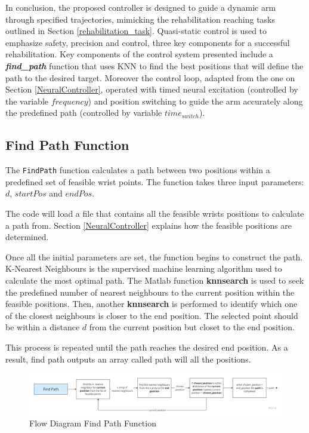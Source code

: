 In conclusion, the proposed controller is designed to guide a dynamic arm through specified trajectories, mimicking the rehabilitation reaching tasks outlined in Section \ref{rehabilitation_task}. Quasi-static control is used to emphasize safety, precision and control, three key components for a successful rehabilitation. Key components of the control system presented include a \textbf{\textit{find\_path} }function that uses KNN to find the best positions that will define the path to the desired target. Moreover the control loop, adapted from the one on Section \ref{NeuralController}, operated with timed neural excitation (controlled by the variable $frequency$) and position switching to guide the arm accurately along the predefined path (controlled by variable $time_{switch}$).




\subsection{Find Path Function} \label{findpath}

The \texttt{FindPath} function calculates a path between two positions within a predefined set of feasible wrist points. The function takes three input parameters: $d$,  $startPos$ and $endPos$. 

The code will load a file that contains all the feasible wrists positions to calculate a path from. Section \ref{NeuralController} explains how the feasible positions are determined. 

Once all the initial parameters are set, the function begins to construct the path. K-Nearest Neighbours is the supervised machine learning algorithm used to calculate the most optimal path. The Matlab function \textbf{knnsearch} is used to seek the predefined number of nearest neighbours to the current position within the feasible positions. Then, another \textbf{knnsearch} is performed to identify which one of the closest neighbours is closer to the end position. The selected point should be within a distance $d$ from the current position but closet to the end position.

This process is repeated until the path reaches the desired end position. As a result, find path outputs an array called path will all the positions.


\begin{figure}[h!]
    \centering
    \includegraphics[width=1\textwidth]{Pictures/Controller/findpath.jpg}
    \caption{Flow Diagram Find Path Function }
    \label{fig:FindPath}
\end{figure}

